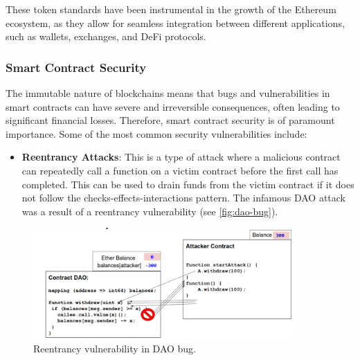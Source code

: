 These token standards have been instrumental in the growth of the
Ethereum ecosystem, as they allow for seamless integration between
different applications, such as wallets, exchanges, and DeFi protocols.




\clearpage
\subsubsection{Smart Contract
	Security}\label{smart-contract-security}

The immutable nature of blockchains means that bugs and vulnerabilities
in smart contracts can have severe and irreversible consequences, often
leading to significant financial losses. Therefore, smart contract
security is of paramount importance. Some of the most common security
vulnerabilities include:

\begin{itemize}
	\tightlist
	\item
	\textbf{Reentrancy Attacks}: This is a type of attack where a
	malicious contract can repeatedly call a function on a victim contract
	before the first call has completed. This can be used to drain funds
	from the victim contract if it does not follow the
	checks-effects-interactions pattern. The infamous DAO attack was a
	result of a reentrancy vulnerability (see \autoref{fig:dao-bug}).
\end{itemize}


\begin{figure}[t]
	\begin{center}
		\includegraphics[width=0.9\textwidth]{./figs/DAO.png}
		\caption{Reentrancy vulnerability in DAO bug.}		
		\label{fig:dao-bug}
	\end{center}	
\end{figure}

